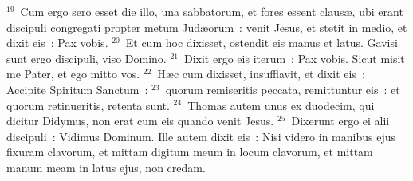 ${}^{19}$~Cum ergo sero esset die illo, una sabbatorum, et fores essent claus\ae , ubi erant discipuli congregati propter metum Jud\ae orum~: venit Jesus, et stetit in medio, et dixit eis~: Pax vobis.
${}^{20}$~Et cum hoc dixisset, ostendit eis manus et latus. Gavisi sunt ergo discipuli, viso Domino.
${}^{21}$~Dixit ergo eis iterum~: Pax vobis. Sicut misit me Pater, et ego mitto vos.
${}^{22}$~H\ae c cum dixisset, insufflavit, et dixit eis~: Accipite Spiritum Sanctum~:
${}^{23}$~quorum remiseritis peccata, remittuntur eis~: et quorum retinueritis, retenta sunt.
${}^{24}$~Thomas autem unus ex duodecim, qui dicitur Didymus, non erat cum eis quando venit Jesus.
${}^{25}$~Dixerunt ergo ei alii discipuli~: Vidimus Dominum. Ille autem dixit eis~: Nisi videro in manibus ejus fixuram clavorum, et mittam digitum meum in locum clavorum, et mittam manum meam in latus ejus, non credam.


